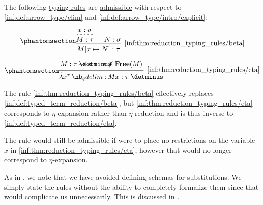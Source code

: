 \begin{proposition}\label{thm:reduction_typing_rules}
  The following \hyperref[con:typing_rule]{typing rules} are \hyperref[con:inference_rule_admissibility]{admissible} with respect to \ref{inf:def:arrow_type/elim} and \ref{inf:def:arrow_type/intro/explicit}:
  \begin{paracol}{2}
    \begin{leftcolumn}
      \ParacolAlignmentHack
      \begin{equation*}\taglabel[\ensuremath{ \rightarrow_\beta }]{inf:thm:reduction_typing_rules/beta}
        \begin{prooftree}
          \hypo{ x: \sigma }
          \infer[dashed]1{ M: \tau }

          \hypo{ N: \sigma }

          \infer2[\ref{inf:thm:reduction_typing_rules/beta}]{ M[x \mapsto N]: \tau }.
        \end{prooftree}
      \end{equation*}
    \end{leftcolumn}

    \begin{rightcolumn}
      \ParacolAlignmentHack
      \begin{equation*}\taglabel[\ensuremath{ \leftarrow_\eta }]{inf:thm:reduction_typing_rules/eta}
        \begin{prooftree}
          \hypo{ M: \tau \synimplies \sigma }
          \hypo{ x \not\in \op*{Free}(M) }
          \infer2[\ref{inf:thm:reduction_typing_rules/eta}]{ \qabs {x^{\tau}} M x: \tau \synimplies \sigma }.
        \end{prooftree}
      \end{equation*}
    \end{rightcolumn}
  \end{paracol}
\end{proposition}
\begin{comments}
  \item The rule \ref{inf:thm:reduction_typing_rules/beta} effectively replaces \ref{inf:def:typed_term_reduction/beta}, but \ref{inf:thm:reduction_typing_rules/eta} corresponds to \( \eta \)-expansion rather than \( \eta \)-reduction and is thus inverse to \ref{inf:def:typed_term_reduction/eta}.

  The rule would still be admissible if were to place no restrictions on the variable \( x \) in \ref{inf:thm:reduction_typing_rules/eta}, however that would no longer correspond to \( \eta \)-expansion.

  \item As in , we note that we have avoided defining schemas for substitutions. We simply state the rules without the ability to completely formalize them since that would complicate us unnecessarily. This is discussed in .
\end{comments}
